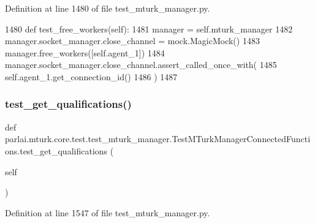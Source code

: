 Definition at line 1480 of file test\+\_\+mturk\+\_\+manager.\+py.


\begin{DoxyCode}
1480     \textcolor{keyword}{def }test\_free\_workers(self):
1481         manager = self.mturk\_manager
1482         manager.socket\_manager.close\_channel = mock.MagicMock()
1483         manager.free\_workers([self.agent\_1])
1484         manager.socket\_manager.close\_channel.assert\_called\_once\_with(
1485             self.agent\_1.get\_connection\_id()
1486         )
1487 
\end{DoxyCode}
\mbox{\label{classparlai_1_1mturk_1_1core_1_1test_1_1test__mturk__manager_1_1TestMTurkManagerConnectedFunctions_a26e45851d3c2abb0b8d7c17eedf9da59}} 
\subsubsection{\texorpdfstring{test\+\_\+get\+\_\+qualifications()}{test\_get\_qualifications()}}
{\footnotesize\ttfamily def parlai.\+mturk.\+core.\+test.\+test\+\_\+mturk\+\_\+manager.\+Test\+M\+Turk\+Manager\+Connected\+Functions.\+test\+\_\+get\+\_\+qualifications (\begin{DoxyParamCaption}\item[{}]{self }\end{DoxyParamCaption})}



Definition at line 1547 of file test\+\_\+mturk\+\_\+manager.\+py.


